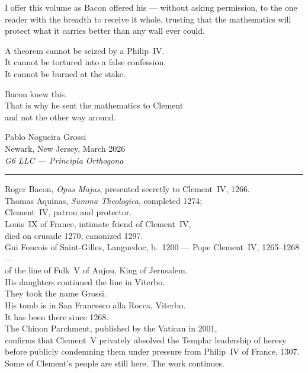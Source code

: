 \vspace{0.45cm}

\noindent I offer this volume as Bacon offered his ---
without asking permission,
to the one reader with the breadth
to receive it whole,
trusting that the mathematics
will protect what it carries
better than any wall ever could.

\vspace{0.45cm}

\noindent A theorem cannot be seized by a Philip~IV.\\
It cannot be tortured into a false confession.\\
It cannot be burned at the stake.

\vspace{0.45cm}

\noindent Bacon knew this.\\
That is why he sent the mathematics to Clement\\
and not the other way around.

\vspace{1.6cm}

\noindent\hfill Pablo Nogueira Grossi\\[0.15cm]
\noindent\hfill Newark, New Jersey, March 2026\\[0.15cm]
\noindent\hfill \textit{G6 LLC\/ --- Principia Orthogona}

\vspace{1.8cm}

\begin{center}
\rule{0.42\textwidth}{0.3pt}

\vspace{0.4cm}

{\scriptsize\color{gray}
Roger Bacon, \textit{Opus Majus}, presented secretly
to Clement~IV, 1266.\\[0.2cm]
Thomas Aquinas, \textit{Summa Theologica},
completed 1274;\\
Clement~IV, patron and protector.\\[0.2cm]
Louis~IX of France, intimate friend of Clement~IV,\\
died on crusade 1270, canonized 1297.\\[0.2cm]
Gui Foucois of Saint-Gilles, Languedoc, b.\ 1200
--- Pope Clement~IV, 1265--1268 ---\\
of the line of Fulk~V of Anjou, King of Jerusalem.\\
His daughters continued the line in Viterbo.\\
They took the name Grossi.\\
His tomb is in San Francesco alla Rocca, Viterbo.\\
It has been there since 1268.\\[0.2cm]
The Chinon Parchment, published by the Vatican
in 2001,\\
confirms that Clement~V privately absolved
the Templar leadership of heresy\\
before publicly condemning them under
pressure from Philip~IV of France, 1307.\\[0.2cm]
Some of Clement's people are still here.
The work continues.}
\end{center}

\newpage
